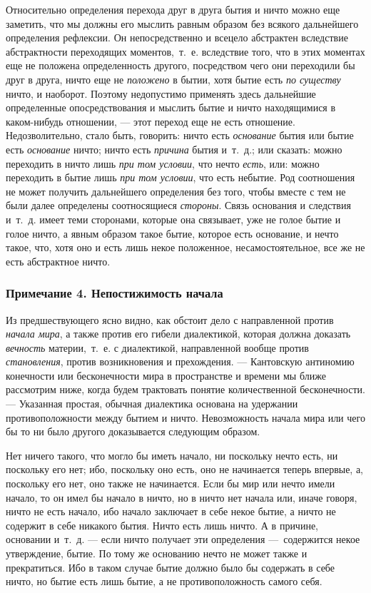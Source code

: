 Относительно определения перехода друг в друга бытия и ничто можно еще
заметить, что мы должны его мыслить равным образом без всякого дальнейшего
определения рефлексии. Он непосредственно и всецело абстрактен вследствие
абстрактности переходящих моментов,~т.~е. вследствие того, что в этих
моментах еще не положена определенность другого, посредством чего они
переходили бы друг в друга, ничто еще не {\em положено}
в бытии, хотя бытие есть {\em по существу} ничто, и
наоборот. Поэтому недопустимо применять здесь дальнейшие определенные
опосредствования и мыслить бытие и ничто находящимися в каком-нибудь
отношении, --- этот переход еще не есть отношение. Недозволительно, стало
быть, говорить: ничто есть {\em основание} бытия или
бытие есть {\em основание} ничто; ничто есть
{\em причина} бытия и~т.~д.; или сказать: можно
переходить в ничто лишь {\em при том условии}, что
нечто {\em есть}, или: можно переходить в бытие лишь
{\em при том условии}, что есть небытие. Род
соотношения не может получить дальнейшего определения без того, чтобы
вместе с тем не были далее определены соотносящиеся
{\em стороны}. Связь основания и следствия и~т.~д.
имеет теми сторонами, которые она связывает, уже не голое бытие и голое
ничто, а явным образом такое бытие, которое есть основание, и нечто такое,
что, хотя оно и есть лишь некое положенное, несамостоятельное, все же не
есть абстрактное ничто.

\subsubsection[Примечание 4. Непостижимость начала]
{Примечание 4. Непостижимость начала}

Из предшествующего ясно видно, как обстоит дело с направленной против
{\em начала мира}, а также против его гибели
диалектикой, которая должна доказать {\em вечность}
материи,~т.~е. с диалектикой, направленной вообще против
{\em становления}, против возникновения и прехождения.
--- Кантовскую антиномию конечности или бесконечности мира в пространстве и
времени мы ближе рассмотрим ниже, когда будем трактовать понятие
количественной бесконечности. --- Указанная простая, обычная диалектика
основана на удержании противоположности между бытием и ничто. Невозможность
начала мира или чего бы то ни было другого доказывается следующим образом.

Нет ничего такого, что могло бы иметь начало, ни поскольку нечто есть, ни
поскольку его нет; ибо, поскольку оно есть, оно не начинается теперь
впервые, а, поскольку его нет, оно также не начинается. Если бы мир или
нечто имели начало, то он имел бы начало в ничто, но в ничто нет начала
или, иначе говоря, ничто не есть начало, ибо начало заключает в себе некое
бытие, а ничто не содержит в себе никакого бытия. Ничто есть лишь ничто. А
в причине, основании и~т.~д. --- если ничто получает эти определения
---~содержится некое утверждение, бытие. По тому же основанию нечто не может
также и прекратиться. Ибо в таком случае бытие должно было бы содержать в
себе ничто, но бытие есть лишь бытие, а не противоположность самого себя.

